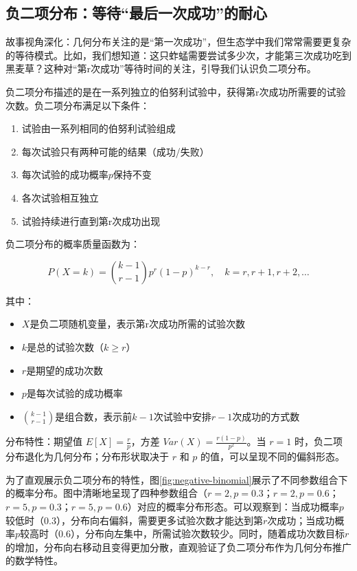 \documentclass[
  twoside,12pt,fontset=none]{ctexbook}
\providecommand{\tightlist}{%
  \setlength{\itemsep}{0pt}\setlength{\parskip}{0pt}}
\begin{document}
\hypertarget{ux8d1fux4e8cux9879ux5206ux5e03ux7b49ux5f85ux6700ux540eux4e00ux6b21ux6210ux529fux7684ux8010ux5fc3}{%
\subsection{负二项分布：等待``最后一次成功''的耐心}\label{ux8d1fux4e8cux9879ux5206ux5e03ux7b49ux5f85ux6700ux540eux4e00ux6b21ux6210ux529fux7684ux8010ux5fc3}}

故事视角深化：几何分布关注的是``第一次成功''，但生态学中我们常常需要更复杂的等待模式。比如，我们想知道：这只蚱蜢需要尝试多少次，才能第三次成功吃到黑麦草？这种对``第r次成功''等待时间的关注，引导我们认识负二项分布。

负二项分布描述的是在一系列独立的伯努利试验中，获得第r次成功所需要的试验次数。负二项分布满足以下条件：

\begin{enumerate}
\def\labelenumi{\arabic{enumi}.}
\tightlist
\item
  试验由一系列相同的伯努利试验组成
\item
  每次试验只有两种可能的结果（成功/失败）
\item
  每次试验的成功概率\(p\)保持不变
\item
  各次试验相互独立
\item
  试验持续进行直到第r次成功出现
\end{enumerate}

负二项分布的概率质量函数为：

\[P(X = k) = \binom{k-1}{r-1} p^r (1-p)^{k-r}, \quad k = r, r+1, r+2, \ldots\]

其中：

\begin{itemize}
\tightlist
\item
  \(X\)是负二项随机变量，表示第r次成功所需的试验次数
\item
  \(k\)是总的试验次数（\(k \geq r\)）
\item
  \(r\)是期望的成功次数
\item
  \(p\)是每次试验的成功概率
\item
  \(\binom{k-1}{r-1}\)是组合数，表示前\(k-1\)次试验中安排\(r-1\)次成功的方式数
\end{itemize}

分布特性：期望值 \(E[X] = \frac{r}{p}\)，方差 \(Var(X) = \frac{r(1-p)}{p^2}\)。当 \(r=1\) 时，负二项分布退化为几何分布；分布形状取决于 \(r\) 和 \(p\) 的值，可以呈现不同的偏斜形态。

为了直观展示负二项分布的特性，图\ref{fig:negative-binomial}展示了不同参数组合下的概率分布。图中清晰地呈现了四种参数组合（\(r=2, p=0.3\)；\(r=2, p=0.6\)；\(r=5, p=0.3\)；\(r=5, p=0.6\)）对应的概率分布形态。可以观察到：当成功概率\(p\)较低时（0.3），分布向右偏斜，需要更多试验次数才能达到第\(r\)次成功；当成功概率\(p\)较高时（0.6），分布向左集中，所需试验次数较少。同时，随着成功次数目标\(r\)的增加，分布向右移动且变得更加分散，直观验证了负二项分布作为几何分布推广的数学特性。
\end{document}
